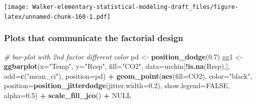 \documentclass[]{book}
\newenvironment{Shaded}{\begin{snugshade}}{\end{snugshade}}
\newcommand{\CommentTok}[1]{\textcolor[rgb]{0.56,0.35,0.01}{\textit{#1}}}
\newcommand{\DataTypeTok}[1]{\textcolor[rgb]{0.13,0.29,0.53}{#1}}
\newcommand{\FloatTok}[1]{\textcolor[rgb]{0.00,0.00,0.81}{#1}}
\newcommand{\KeywordTok}[1]{\textcolor[rgb]{0.13,0.29,0.53}{\textbf{#1}}}
\newcommand{\NormalTok}[1]{#1}
\newcommand{\OperatorTok}[1]{\textcolor[rgb]{0.81,0.36,0.00}{\textbf{#1}}}
\newcommand{\OtherTok}[1]{\textcolor[rgb]{0.56,0.35,0.01}{#1}}
\newcommand{\StringTok}[1]{\textcolor[rgb]{0.31,0.60,0.02}{#1}}
\begin{document}
\texttt{[image: Walker-elementary-statistical-modeling-draft\_files/figure-latex/unnamed-chunk-160-1.pdf]}

\hypertarget{plots-that-communicate-the-factorial-design}{%
\subsubsection{Plots that communicate the factorial design}\label{plots-that-communicate-the-factorial-design}}

\begin{Shaded}
\begin{Highlighting}[]
\CommentTok{# bar-plot with 2nd factor different color}
\NormalTok{pd <-}\StringTok{ }\KeywordTok{position_dodge}\NormalTok{(}\FloatTok{0.7}\NormalTok{)}
\NormalTok{gg1 <-}\StringTok{ }\KeywordTok{ggbarplot}\NormalTok{(}\DataTypeTok{x=}\StringTok{"Temp"}\NormalTok{,}
          \DataTypeTok{y=}\StringTok{"Resp"}\NormalTok{,}
          \DataTypeTok{fill=}\StringTok{"CO2"}\NormalTok{,}
          \DataTypeTok{data=}\NormalTok{urchin[}\OperatorTok{!}\KeywordTok{is.na}\NormalTok{(Resp),],}
          \DataTypeTok{add=}\KeywordTok{c}\NormalTok{(}\StringTok{"mean_ci"}\NormalTok{),}
          \DataTypeTok{position=}\NormalTok{pd) }\OperatorTok{+}
\StringTok{  }\KeywordTok{geom_point}\NormalTok{(}\KeywordTok{aes}\NormalTok{(}\DataTypeTok{fill=}\NormalTok{CO2), }
             \DataTypeTok{color=}\StringTok{"black"}\NormalTok{, }
             \DataTypeTok{position=}\KeywordTok{position_jitterdodge}\NormalTok{(}\DataTypeTok{jitter.width=}\FloatTok{0.2}\NormalTok{), }
             \DataTypeTok{show.legend=}\OtherTok{FALSE}\NormalTok{, }
             \DataTypeTok{alpha=}\FloatTok{0.5}\NormalTok{) }\OperatorTok{+}
\StringTok{  }\KeywordTok{scale_fill_jco}\NormalTok{() }\OperatorTok{+}
\StringTok{  }\OtherTok{NULL}


\end{Highlighting}
\end{Shaded}
\end{document}
